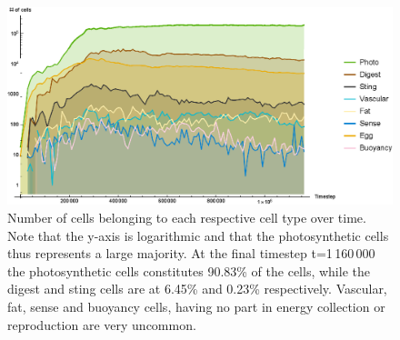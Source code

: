\begin{figure}
  \begin{center}
  \includegraphics[width=\textwidth]{figure/cellTypesOverTime}
  \caption{Number of cells belonging to each respective cell type over time. Note that the y-axis is logarithmic and that the photosynthetic cells thus represents a large majority. At the final timestep t=1\,160\,000 the photosynthetic cells constitutes 90.83\% of the cells, while the digest and sting cells are at 6.45\% and 0.23\% respectively. Vascular, fat, sense and buoyancy cells, having no part in energy collection or reproduction are very uncommon.}
  \label{fig:cellTypesOverTime}
  \end{center}
\end{figure}

